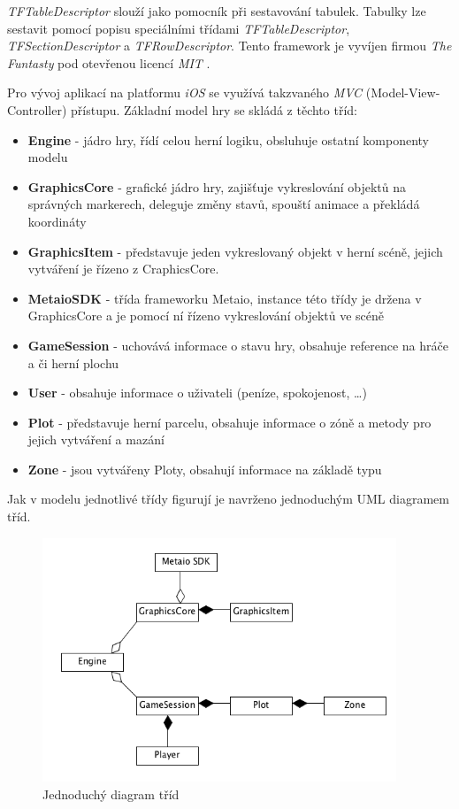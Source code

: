 \documentclass[twoside,12pt]{article}
\begin{document}
\textit{TFTableDescriptor} slouží jako pomocník při sestavování tabulek. Tabulky lze sestavit pomocí popisu  speciálními třídami \textit{TFTableDescriptor}, \textit{TFSectionDescriptor} a \textit{TFRowDescriptor}. Tento framework je vyvíjen firmou \textit{The Funtasty} pod otevřenou licencí \textit{MIT} \cite{tftabledescriptor}.



Pro vývoj aplikací na platformu \textit{iOS} se využívá takzvaného \textit{MVC} (Model-View-Controller) přístupu. Základní model hry se skládá z těchto tříd:

\begin{itemize}
	\item \textbf{Engine} - jádro hry, řídí celou herní logiku, obsluhuje ostatní komponenty modelu
	\item \textbf{GraphicsCore} - grafické jádro hry, zajišťuje vykreslování objektů na správných markerech, deleguje změny stavů, spouští animace a překládá koordináty
	\item \textbf{GraphicsItem} - představuje jeden vykreslovaný objekt v herní scéně, jejich vytváření je řízeno z CraphicsCore.
	\item \textbf{MetaioSDK} - třída frameworku Metaio, instance této třídy je držena v GraphicsCore a je pomocí ní řízeno vykreslování objektů ve scéně
	\item \textbf{GameSession} - uchovává informace o stavu hry, obsahuje reference na hráče a či herní plochu
	\item \textbf{User} - obsahuje informace o uživateli (peníze, spokojenost, \dots)
	\item \textbf{Plot} - představuje herní parcelu, obsahuje informace o zóně a metody pro jejich vytváření a mazání
	\item \textbf{Zone} - jsou vytvářeny Ploty, obsahují informace na základě typu
\end{itemize}

Jak v modelu jednotlivé třídy figurují je navrženo jednoduchým UML diagramem tříd.

\begin{figure}[H]
\centering
    \includegraphics[width=400px, center]{images/model.png}
\captionsetup{justification=centering}
    \caption{Jednoduchý diagram tříd}
    \label{class_diagram}
\end{figure}
\end{document}
